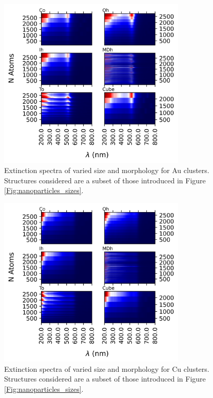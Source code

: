 \begin{figure}[b]
    \includegraphics[width=0.8\textwidth]{figures/LM/GDM/Au_Specs.png}
    \caption{Extinction spectra of varied size and morphology for Au clusters. Structures considered are a subset of those introduced in Figure \ref{Fig:nanoparticles_sizes}.}
    \label{Fig:Size_Au_GDM}
\end{figure}

\begin{figure}[b]
    \includegraphics[width=0.8\textwidth]{figures/LM/GDM/Cu_Specs.png}
    \caption{Extinction spectra of varied size and morphology for Cu clusters. Structures considered are a subset of those introduced in Figure \ref{Fig:nanoparticles_sizes}.} 
    \label{Fig:Size_Cu_GDM}
\end{figure}

